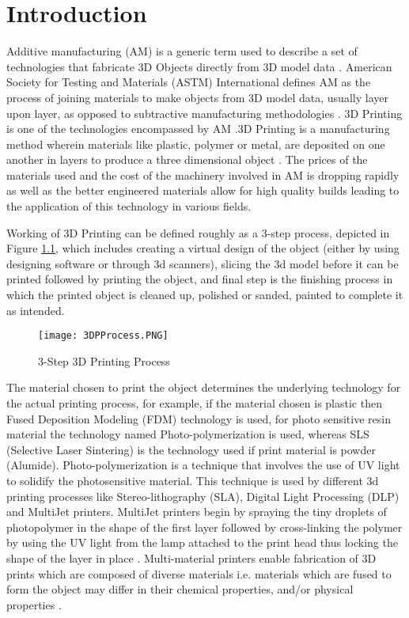\chapter{Introduction}
Additive manufacturing (AM) is a generic term used to describe a set of technologies that fabricate 3D Objects directly from 3D model data \cite{KRUTH}. American Society for Testing and Materials (ASTM) International defines AM as the process of joining materials to make objects from 3D model data, usually layer upon layer, as opposed to subtractive manufacturing methodologies \cite{cwig} . 3D Printing is one of the technologies encompassed by AM \cite{Conner}.3D Printing is a manufacturing method  wherein materials like plastic, polymer or metal, are deposited on one another in layers to produce a three dimensional object \cite{sdl}.  The prices of the materials used and the cost of the machinery involved in AM is dropping rapidly as well as the better engineered materials allow for high quality builds leading to the application of this technology in various fields. \newline

Working of 3D Printing can be defined roughly as a 3-step process, depicted in Figure \ref{fig:DP}, which includes creating a virtual design of the object (either by using designing software or through 3d scanners), slicing the 3d model before it can be printed followed by printing the object, and final step is the finishing process in which the printed object is cleaned up, polished or sanded, painted to complete it as intended.  
\begin{figure}[ht!]
\centering
\texttt{[image: 3DPProcess.PNG]}
\caption{3-Step 3D Printing Process}
\label{fig:DP}
\end{figure}

The material chosen to print the object determines the underlying technology for the actual printing process, for example, if the material chosen is plastic then Fused Deposition Modeling (FDM) technology is used, for photo sensitive resin material the technology named Photo-polymerization is used, whereas SLS (Selective Laser Sintering) is the technology used if print material is powder (Alumide). Photo-polymerization is a technique that involves the use of UV light to solidify the photosensitive material.  This technique is used by different 3d printing processes like Stereo-lithography (SLA), Digital Light Processing (DLP) and MultiJet printers.  MultiJet printers begin by spraying the tiny droplets of photopolymer in the shape of the first layer followed by cross-linking the polymer by using the UV light from the lamp attached to the print head thus locking the shape of the layer in place \cite{dpW}. Multi-material printers enable fabrication of 3D prints which are composed of diverse materials i.e. materials which are fused to form the object may differ in their chemical properties, and/or physical properties \cite{Doubrovski}.\newline

